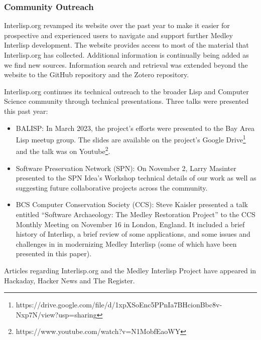 \documentclass[sigconf]{acmart}
\begin{document}
\subsubsection{Community Outreach}

Interlisp.org revamped its website over the past year to make it easier for prospective and experienced users to navigate and support further Medley Interlisp development. The website provides access to most of the material that Interlisp.org has collected. Additional information is continually being added as we find new sources. Information search and retrieval was extended beyond the website to the GitHub repository and the Zotero repository.



Interlisp.org continues its technical outreach to the broader Lisp and Computer Science community through technical presentations. Three talks were presented this past year:
\begin{itemize}
    \item BALISP: In March 2023, the project's efforts were presented to the Bay Area Lisp meetup group. The slides are available on the project's Google Drive\footnote{https://drive.google.com/file/d/1xpXSoEnc5PPnIa7BHcionBbc8v-Nxp7N/view?usp=sharing} and the talk was on Youtube\footnote{https://www.youtube.com/watch?v=N1MobfEaoWY}.
    \item Software Preservation Network (SPN): On November 2, Larry Masinter presented to the SPN Idea's Workshop technical details of our work as well as suggesting future collaborative projects across the community.
    \item BCS Computer Conservation Society (CCS): Steve Kaisler presented a talk entitled ``Software Archaeology: The Medley Restoration Project'' to the CCS Monthly Meeting on November 16 in London, England. It included a brief history of Interlisp, a brief review of some applications, and some issues and challenges in in modernizing Medley Interlisp (some of which have been presented in this paper).
\end{itemize}

Articles regarding Interlisp.org and the Medley Interlisp Project have appeared in Hackaday, Hacker News and The Register\cite{Proven23}.
\end{document}
